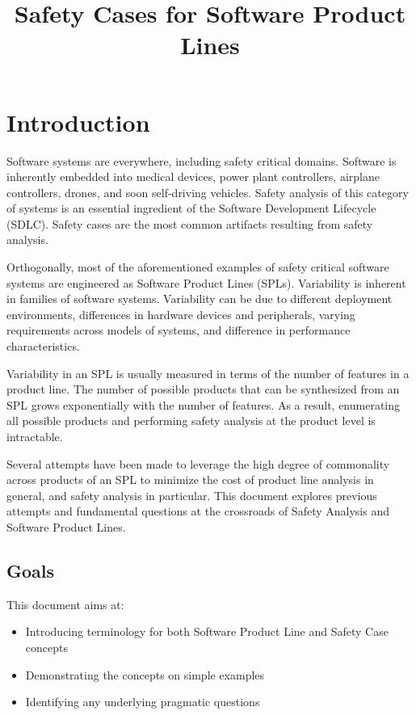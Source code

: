 \documentclass[11pt]{article}
\title{Safety Cases for Software Product Lines}
\date{}                                           %
\begin{document}
\maketitle


\section{Introduction}
Software systems are everywhere, including safety critical domains. Software is inherently embedded into medical devices, power plant controllers, airplane controllers, drones, and soon self-driving vehicles. Safety analysis of this category of systems is an essential ingredient of the Software Development Lifecycle (SDLC). Safety cases are the most common artifacts resulting from safety analysis.

Orthogonally, most of the aforementioned examples of safety critical software systems are engineered as Software Product Lines (SPLs). Variability is inherent in families of software systems. Variability can be due to different deployment environments, differences in hardware devices and peripherals, varying requirements across models of systems, and difference in performance characteristics.

Variability in an SPL is usually measured in terms of the number of features in a product line. The number of possible products that can be synthesized from an SPL grows exponentially with the number of features. As a result, enumerating all possible products and performing safety analysis at the product level is intractable. 

Several attempts have been made to leverage the high degree of commonality across products of an SPL to minimize the cost of product line analysis in general, and safety analysis in particular. This document explores previous attempts and fundamental questions at the crossroads of Safety Analysis and Software Product Lines.

\subsection{Goals}
This document aims at:
\begin{itemize}
\item Introducing terminology for both Software Product Line and Safety Case concepts
\item Demonstrating the concepts on simple examples
\item Identifying any underlying pragmatic questions
\end{itemize}
\end{document}
